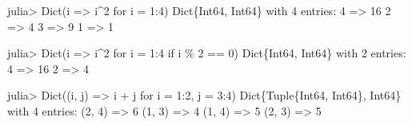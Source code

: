 \documentclass[
  letterpaper,
  DIV=11,
  numbers=noendperiod]{scrreprt}
\newenvironment{Shaded}{\begin{snugshade}}{\end{snugshade}}
\newcommand{\ControlFlowTok}[1]{\textcolor[rgb]{0.00,0.23,0.31}{#1}}
\newcommand{\DataTypeTok}[1]{\textcolor[rgb]{0.68,0.00,0.00}{#1}}
\newcommand{\FloatTok}[1]{\textcolor[rgb]{0.68,0.00,0.00}{#1}}
\newcommand{\FunctionTok}[1]{\textcolor[rgb]{0.28,0.35,0.67}{#1}}
\newcommand{\NormalTok}[1]{\textcolor[rgb]{0.00,0.23,0.31}{#1}}
\newcommand{\OperatorTok}[1]{\textcolor[rgb]{0.37,0.37,0.37}{#1}}
\begin{document}
\begin{Shaded}
\begin{Highlighting}[]
\NormalTok{julia}\OperatorTok{\textgreater{}} \FunctionTok{Dict}\NormalTok{(i }\OperatorTok{=\textgreater{}}\NormalTok{ i}\OperatorTok{\^{}}\FloatTok{2} \ControlFlowTok{for}\NormalTok{ i }\OperatorTok{=} \FloatTok{1}\OperatorTok{:}\FloatTok{4}\NormalTok{)}
\DataTypeTok{Dict}\NormalTok{\{}\DataTypeTok{Int64}\NormalTok{, }\DataTypeTok{Int64}\NormalTok{\} with }\FloatTok{4}\NormalTok{ entries}\OperatorTok{:}
  \FloatTok{4} \OperatorTok{=\textgreater{}} \FloatTok{16}
  \FloatTok{2} \OperatorTok{=\textgreater{}} \FloatTok{4}
  \FloatTok{3} \OperatorTok{=\textgreater{}} \FloatTok{9}
  \FloatTok{1} \OperatorTok{=\textgreater{}} \FloatTok{1}

\NormalTok{julia}\OperatorTok{\textgreater{}} \FunctionTok{Dict}\NormalTok{(i }\OperatorTok{=\textgreater{}}\NormalTok{ i}\OperatorTok{\^{}}\FloatTok{2} \ControlFlowTok{for}\NormalTok{ i }\OperatorTok{=} \FloatTok{1}\OperatorTok{:}\FloatTok{4} \ControlFlowTok{if}\NormalTok{ i }\OperatorTok{\%} \FloatTok{2} \OperatorTok{==} \FloatTok{0}\NormalTok{)}
\DataTypeTok{Dict}\NormalTok{\{}\DataTypeTok{Int64}\NormalTok{, }\DataTypeTok{Int64}\NormalTok{\} with }\FloatTok{2}\NormalTok{ entries}\OperatorTok{:}
  \FloatTok{4} \OperatorTok{=\textgreater{}} \FloatTok{16}
  \FloatTok{2} \OperatorTok{=\textgreater{}} \FloatTok{4}

\NormalTok{julia}\OperatorTok{\textgreater{}} \FunctionTok{Dict}\NormalTok{((i, j) }\OperatorTok{=\textgreater{}}\NormalTok{ i }\OperatorTok{+}\NormalTok{ j }\ControlFlowTok{for}\NormalTok{ i }\OperatorTok{=} \FloatTok{1}\OperatorTok{:}\FloatTok{2}\NormalTok{, j }\OperatorTok{=} \FloatTok{3}\OperatorTok{:}\FloatTok{4}\NormalTok{)}
\DataTypeTok{Dict}\NormalTok{\{}\DataTypeTok{Tuple}\NormalTok{\{}\DataTypeTok{Int64}\NormalTok{, }\DataTypeTok{Int64}\NormalTok{\}, }\DataTypeTok{Int64}\NormalTok{\} with }\FloatTok{4}\NormalTok{ entries}\OperatorTok{:}
\NormalTok{  (}\FloatTok{2}\NormalTok{, }\FloatTok{4}\NormalTok{) }\OperatorTok{=\textgreater{}} \FloatTok{6}
\NormalTok{  (}\FloatTok{1}\NormalTok{, }\FloatTok{3}\NormalTok{) }\OperatorTok{=\textgreater{}} \FloatTok{4}
\NormalTok{  (}\FloatTok{1}\NormalTok{, }\FloatTok{4}\NormalTok{) }\OperatorTok{=\textgreater{}} \FloatTok{5}
\NormalTok{  (}\FloatTok{2}\NormalTok{, }\FloatTok{3}\NormalTok{) }\OperatorTok{=\textgreater{}} \FloatTok{5}
\end{Highlighting}
\end{Shaded}
\end{document}

